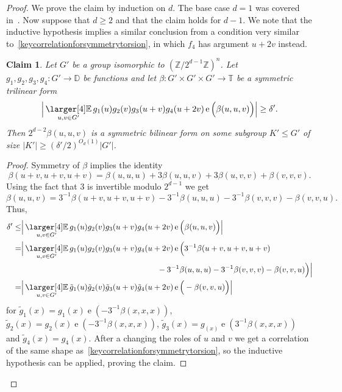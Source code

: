 \documentclass[a4paper,11pt]{article}
\numberwithin{theorem}{section}
\newtheorem{claim}[theorem]{Claim}
\theoremstyle{definition}
\newcommand{\on}[1]{
	\operatorname{#1}
}
\newcommand{\exx}{
  \mathop{
    \mathchoice{\vcenter{\hbox{\larger[4]$\mathbb{E}$}}}
               {\kern0pt\mathbb{E}}
               {\kern0pt\mathbb{E}}
               {\kern0pt\mathbb{E}}
  }\displaylimits
}
\begin{document}
\begin{proof} We prove the claim by induction on $d$. The base case $d = 1$ was covered in~\cite{Tidor}. Now suppose that $d \geq 2$ and that the claim holds for $d - 1$. We note that the inductive hypothesis implies a similar conclusion from a condition very similar to~\eqref{keycorrelationforsymmetrytorsion}, in which $f_4$ has argument $u + 2v$ instead.

\begin{claim}\label{symmetryargumnetexpressionreversedclaim}
    Let $G'$ be a group isomorphic to $(\mathbb{Z}/2^{d-1}\mathbb{Z})^n$. Let $g_1, g_2, g_3, g_4 : G' \to \mathbb{D}$ be functions and let $\beta : G'\times G' \times G' \to \mathbb{T}$ be a symmetric trilinear form
    \begin{equation}\Big|\exx_{u , v \in G'} g_1(u) g_2(v) g_3(u + v) g_4(u + 2v) \on{e}\Big(\beta(u,u,v)\Big)\Big| \geq \delta'.\label{keycorrelationforsymmetrytorsionReversed}\end{equation}
    Then $2^{d-2} \beta(u,u,v)$ is a symmetric bilinear form on some subgroup $K' \leq G'$ of size $|K'| \geq  (\delta'/2)^{O_d(1)}|G'|$.
\end{claim}

\begin{proof}
    Symmetry of $\beta$ implies the identity
    \[\beta(u + v, u + v, u+v) = \beta(u,u,u) + 3\beta(u,u,v) + 3\beta(u,v,v) + \beta(v,v,v).\]
    Using the fact that 3 is invertible modulo $2^{d-1}$ we get
    \[\beta(u,u,v) = 3^{-1}\beta(u + v, u + v, u+v) - 3^{-1}\beta(u,u,u) - 3^{-1}\beta(v,v,v) - \beta(v,v,u).\]
    Thus,
    \begin{align*}\delta' \leq &\Big|\exx_{u , v \in G'} g_1(u) g_2(v) g_3(u + v) g_4(u + 2v) \on{e}\Big(\beta(u,u,v)\Big)\Big|\\
    = &\Big|\exx_{u , v \in G'} g_1(u) g_2(v) g_3(u + v) g_4(u + 2v) \on{e}\Big(3^{-1}\beta(u + v, u + v, u+v) \\
    &\hspace{6cm}- 3^{-1}\beta(u,u,u) - 3^{-1}\beta(v,v,v) - \beta(v,v,u)\Big)\Big|\\
    = &\Big|\exx_{u , v \in G'} \tilde{g}_1(u) \tilde{g}_2(v) \tilde{g}_3(u + v) \tilde{g}_4(u + 2v) \on{e}\Big(- \beta(v,v,u)\Big)\Big|\end{align*}
    for $\tilde{g}_1(x) = g_1(x) \on{e}(- 3^{-1}\beta(x,x,x))$, $\tilde{g}_2(x) = g_2(x) \on{e}(- 3^{-1}\beta(x,x,x))$, $\tilde{g}_3(x) = g_(x) \on{e}(3^{-1}\beta(x,x,x))$ and $\tilde{g}_4(x) = g_4(x)$. After a changing the roles of $u$ and $v$ we get a correlation of the same shape as~\eqref{keycorrelationforsymmetrytorsion}, so the inductive hypothesis can be applied, proving the claim.
\end{proof}



\end{proof}
\end{document}
